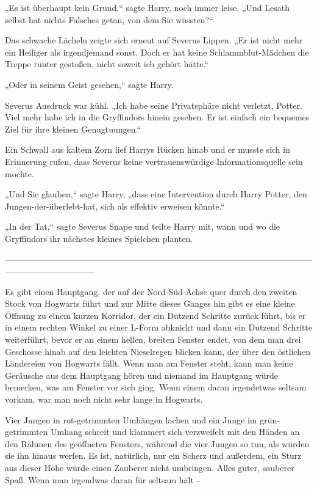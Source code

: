 {„Es ist überhaupt kein Grund,“ sagte Harry, noch immer leise. „Und Lesath selbst hat nichts Falsches getan, von dem Sie wüssten?“

Das schwache Lächeln zeigte sich erneut auf Severus Lippen. „Er ist nicht mehr ein Heiliger als irgendjemand sonst. Doch er hat keine Schlammblut-Mädchen die Treppe runter gestoßen, nicht soweit ich gehört hätte.“

„Oder in seinem Geist gesehen,“ sagte Harry.

Severus Ausdruck war kühl. „Ich habe seine Privatsphäre nicht verletzt, Potter. Viel mehr habe ich in die Gryffindors hinein gesehen. Er ist einfach ein bequemes Ziel für ihre kleinen Genugtuungen.“

Ein Schwall aus kaltem Zorn lief Harrys Rücken hinab und er musste sich in Erinnerung rufen, dass Severus keine vertrauenswürdige Informationsquelle sein mochte.

„Und Sie glauben,“ sagte Harry, „dass eine Intervention durch Harry Potter, den Jungen-der-überlebt-hat, sich als effektiv erweisen könnte.“

„In der Tat,“ sagte Severus Snape und teilte Harry mit, wann und wo die Gryffindors ihr nächstes kleines Spielchen planten.

--------------------------------------------------------------------------------------------------------------------------------------------

Es gibt einen Hauptgang, der auf der Nord-Süd-Achse quer durch den zweiten Stock von Hogwarts führt und zur Mitte dieses Ganges hin gibt es eine kleine Öffnung zu einem kurzen Korridor, der ein Dutzend Schritte zurück führt, bis er in einem rechten Winkel zu einer L-Form abknickt und dann ein Dutzend Schritte weiterführt, bevor er an einem hellen, breiten Fenster endet, von dem man drei Geschosse hinab auf den leichten Nieselregen blicken kann, der über den östlichen Ländereien von Hogwarts fällt. Wenn man am Fenster steht, kann man keine Geräusche aus dem Hauptgang hören und niemand im Hauptgang würde bemerken, was am Fenster vor sich ging. Wenn einem daran irgendetwas seltsam vorkam, war man noch nicht sehr lange in Hogwarts.

Vier Jungen in rot-getrimmten Umhängen lachen und ein Junge im grün-getrimmten Umhang schreit und klammert sich verzweifelt mit den Händen an den Rahmen des geöffneten Fensters, während die vier Jungen so tun, als würden sie ihn hinaus werfen. Es ist, natürlich, nur ein Scherz und außerdem, ein Sturz aus dieser Höhe würde einen Zauberer nicht umbringen. Alles guter, sauberer Spaß. Wenn man irgendwas daran für seltsam hält -

}
